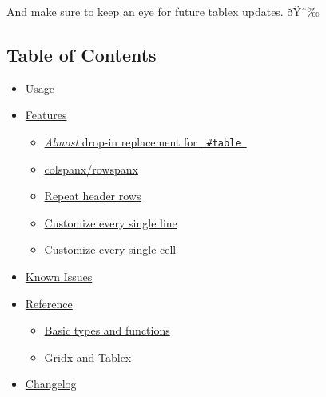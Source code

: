 And make sure to keep an eye for future tablex updates. ðŸ˜‰

\subsection{Table of Contents}\label{table-of-contents}

\begin{itemize}
\tightlist
\item
  \href{https://github.com/typst/packages/raw/main/packages/preview/tablex/0.0.9/\#usage}{Usage}
\item
  \href{https://github.com/typst/packages/raw/main/packages/preview/tablex/0.0.9/\#features}{Features}

  \begin{itemize}
  \tightlist
  \item
    \href{https://github.com/typst/packages/raw/main/packages/preview/tablex/0.0.9/\#almost-drop-in-replacement-for-table}{\emph{Almost}
    drop-in replacement for \texttt{\ \#table\ }}
  \item
    \href{https://github.com/typst/packages/raw/main/packages/preview/tablex/0.0.9/\#colspanxrowspanx}{colspanx/rowspanx}
  \item
    \href{https://github.com/typst/packages/raw/main/packages/preview/tablex/0.0.9/\#repeat-header-rows}{Repeat
    header rows}
  \item
    \href{https://github.com/typst/packages/raw/main/packages/preview/tablex/0.0.9/\#customize-every-single-line}{Customize
    every single line}
  \item
    \href{https://github.com/typst/packages/raw/main/packages/preview/tablex/0.0.9/\#customize-every-single-cell}{Customize
    every single cell}
  \end{itemize}
\item
  \href{https://github.com/typst/packages/raw/main/packages/preview/tablex/0.0.9/\#known-issues}{Known
  Issues}
\item
  \href{https://github.com/typst/packages/raw/main/packages/preview/tablex/0.0.9/\#reference}{Reference}

  \begin{itemize}
  \tightlist
  \item
    \href{https://github.com/typst/packages/raw/main/packages/preview/tablex/0.0.9/\#basic-types-and-functions}{Basic
    types and functions}
  \item
    \href{https://github.com/typst/packages/raw/main/packages/preview/tablex/0.0.9/\#gridx-and-tablex}{Gridx
    and Tablex}
  \end{itemize}
\item
  \href{https://github.com/typst/packages/raw/main/packages/preview/tablex/0.0.9/\#changelog}{Changelog}


\end{itemize}

